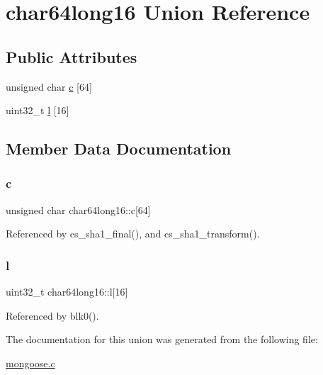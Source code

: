 \hypertarget{unionchar64long16}{}\section{char64long16 Union Reference}
\label{unionchar64long16}
\subsection*{Public Attributes}
\begin{DoxyCompactItemize}
\item 
unsigned char \hyperlink{unionchar64long16_a7067dbe3b0ff3f11661acb8cd97bcff9_a7067dbe3b0ff3f11661acb8cd97bcff9}{c} \mbox{[}64\mbox{]}
\item 
uint32\+\_\+t \hyperlink{unionchar64long16_a4f1edebae3468a551ff2d0cdaecb467d_a4f1edebae3468a551ff2d0cdaecb467d}{l} \mbox{[}16\mbox{]}
\end{DoxyCompactItemize}


\subsection{Member Data Documentation}
\mbox{\label{unionchar64long16_a7067dbe3b0ff3f11661acb8cd97bcff9_a7067dbe3b0ff3f11661acb8cd97bcff9}} 
\subsubsection{\texorpdfstring{c}{c}}
{\footnotesize\ttfamily unsigned char char64long16\+::c\mbox{[}64\mbox{]}}



Referenced by cs\+\_\+sha1\+\_\+final(), and cs\+\_\+sha1\+\_\+transform().

\mbox{\label{unionchar64long16_a4f1edebae3468a551ff2d0cdaecb467d_a4f1edebae3468a551ff2d0cdaecb467d}} 
\subsubsection{\texorpdfstring{l}{l}}
{\footnotesize\ttfamily uint32\+\_\+t char64long16\+::l\mbox{[}16\mbox{]}}



Referenced by blk0().



The documentation for this union was generated from the following file\+:\begin{DoxyCompactItemize}
\item 
\hyperlink{mongoose_8c}{mongoose.\+c}\end{DoxyCompactItemize}
